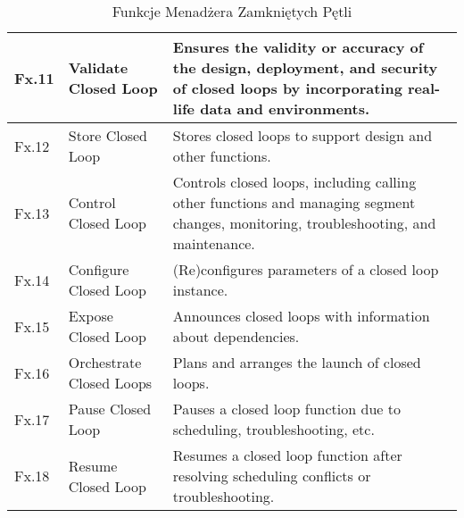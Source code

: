 \begin{table}[h!]
\begin{tabular}{|p{2cm}|p{4cm}|p{9cm}|}
Fx.11 & Validate Closed Loop & Ensures the validity or accuracy of the design, deployment, and security of closed loops by incorporating real-life data and environments. \\ \hline
Fx.12 & Store Closed Loop & Stores closed loops to support design and other functions. \\ \hline
Fx.13 & Control Closed Loop & Controls closed loops, including calling other functions and managing segment changes, monitoring, troubleshooting, and maintenance. \\ \hline
Fx.14 & Configure Closed Loop & (Re)configures parameters of a closed loop instance. \\ \hline
Fx.15 & Expose Closed Loop & Announces closed loops with information about dependencies. \\ \hline
Fx.16 & Orchestrate Closed Loops & Plans and arranges the launch of closed loops. \\ \hline
Fx.17 & Pause Closed Loop & Pauses a closed loop function due to scheduling, troubleshooting, etc. \\ \hline
Fx.18 & Resume Closed Loop & Resumes a closed loop function after resolving scheduling conflicts or troubleshooting. \\ \hline
\end{tabular}
\caption{Funkcje Menadżera Zamkniętych Pętli}
\label{tab:closed_loop_functions}
\end{table}
